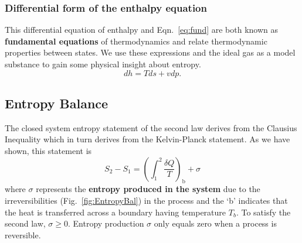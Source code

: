 \subsubsection{Differential form of the enthalpy equation}
This differential equation of enthalpy and Eqn.~\eqref{eq:fund} are both known as \textbf{fundamental equations} of thermodynamics and relate thermodynamic properties between states. We use these expressions and the ideal gas as a model substance to gain some physical insight about entropy. 
\begin{equation}
dh = Tds + v dp.
\end{equation}
\subsection{Entropy Balance}
The closed system entropy statement of the second law derives from the Clausius Inequality which in turn derives from the Kelvin-Planck statement. As we have shown, this statement is
\begin{equation}\label{eq:Centropy1}
S_2 - S_1 = \left(\int_1^2 \frac{\delta Q}{T}\right)_{\text{b}} +\sigma 
\end{equation}
where $\sigma$ represents the \textbf{entropy produced in the system} due to the irreversibilities (Fig.~\ref{fig:EntropyBal}) in the process and the `b' indicates that the heat is transferred across a boundary having temperature $T_b$. To satisfy the second law, \underline{$\sigma \geq 0$}. Entropy production $\sigma$ only equals zero when a process is reversible. 

